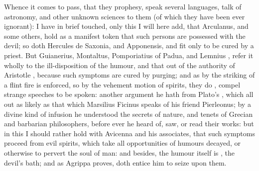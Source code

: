 {Whence it comes to pass, that they prophesy, speak several languages, talk of
astronomy, and other unknown sciences to them (of which they have been ever
ignorant): I have in brief touched, only this I will here
add, that Arculanus,  and
some others, hold as a manifest token that such persons
are possessed with the devil; so doth Hercules de Saxonia,
and Apponensis, and fit only to be cured by a priest. But
Guianerius, Montaltus, Pomporiatius
of Padua, and Lemnius , refer it wholly to
the ill-disposition of the humour, and that out of the
authority of Aristotle , because such
symptoms are cured by purging; and as by the striking of a flint fire is
enforced, so by the vehement motion of spirits, they do , compel strange speeches to be spoken: another argument he hath from
Plato's , which all out as likely as that which
Marsilius Ficinus speaks of his friend Pierleonus; by a
divine kind of infusion he understood the secrets of nature, and tenets of
Grecian and barbarian philosophers, before ever he heard of, saw, or read their
works: but in this I should rather hold with Avicenna and his associates, that
such symptoms proceed from evil spirits, which take all opportunities of
humours decayed, or otherwise to pervert the soul of man: and besides, the
humour itself is , the devil's bath; and as Agrippa proves,
doth entice him to seize upon them.
}
